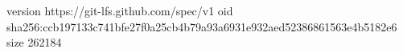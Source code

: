 version https://git-lfs.github.com/spec/v1
oid sha256:ccb197133c741bfe27f0a25cb4b79a93a6931e932aed52386861563e4b5182e6
size 262184
